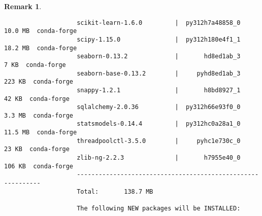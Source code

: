 \documentclass{article}
\newtheorem{remark}{Remark}
\begin{document}
\begin{itemize}
\begin{itemize}
\begin{itemize}
\begin{remark}
\begin{verbatim}
					scikit-learn-1.6.0         |  py312h7a48858_0        10.0 MB  conda-forge
					scipy-1.15.0               |  py312h180e4f1_1        18.2 MB  conda-forge
					seaborn-0.13.2             |       hd8ed1ab_3           7 KB  conda-forge
					seaborn-base-0.13.2        |     pyhd8ed1ab_3         223 KB  conda-forge
					snappy-1.2.1               |       h8bd8927_1          42 KB  conda-forge
					sqlalchemy-2.0.36          |  py312h66e93f0_0         3.3 MB  conda-forge
					statsmodels-0.14.4         |  py312hc0a28a1_0        11.5 MB  conda-forge
					threadpoolctl-3.5.0        |     pyhc1e730c_0          23 KB  conda-forge
					zlib-ng-2.2.3              |       h7955e40_0         106 KB  conda-forge
					------------------------------------------------------------
					Total:       138.7 MB
					
					The following NEW packages will be INSTALLED:
					

\end{verbatim}
\end{remark}
\end{itemize}
\end{itemize}
\end{itemize}
\end{document}
